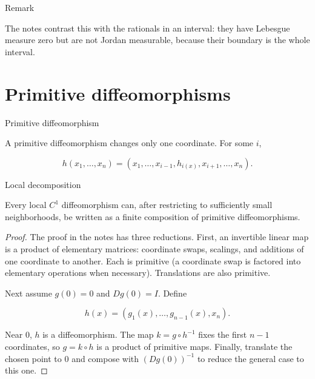 \begin{qlremark}{Remark}

The notes contrast this with the rationals in an interval: they have Lebesgue measure zero but are not Jordan measurable, because their boundary is the whole interval.

\end{qlremark}

\section{Primitive diffeomorphisms}

\begin{definition}{Primitive diffeomorphism}

A primitive diffeomorphism changes only one coordinate. For some \(i\),

\[h\left( {x_{1},\ldots,x_{n}} \right) = \left( {x_{1},\ldots,x_{i - 1},h_{i{(x)}},x_{i + 1},\ldots,x_{n}} \right).\]

\end{definition}

\begin{theorem}{Local decomposition}

Every local \(C^{1}\) diffeomorphism can, after restricting to sufficiently small neighborhoods, be written as a finite composition of primitive diffeomorphisms.

\end{theorem}

\begin{proof}

The proof in the notes has three reductions. First, an invertible linear map is a product of elementary matrices: coordinate swaps, scalings, and additions of one coordinate to another. Each is primitive (a coordinate swap is factored into elementary operations when necessary). Translations are also primitive.

Next assume \(g(0) = 0\) and \(Dg(0) = I\). Define

\[h(x) = \left( {g_{1}(x),\ldots,g_{n - 1}(x),x_{n}} \right).\]

Near \(0\), \(h\) is a diffeomorphism. The map \(k = g \circ h^{- 1}\) fixes the first \(n - 1\) coordinates, so \(g = k \circ h\) is a product of primitive maps. Finally, translate the chosen point to \(0\) and compose with \(\left( {Dg(0)} \right)^{- 1}\) to reduce the general case to this one.

\end{proof}

